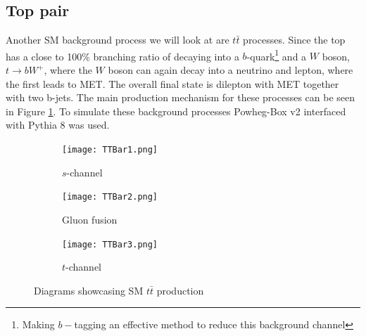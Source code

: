 \documentclass[12pt, a4paper]{book}
\begin{document}
\subsection{Top pair}
Another SM background process we will look at are $t\bar{t}$ processes. Since the top has a close to 100\% branching ratio of decaying into a $b$-quark\footnote{Making $b-$tagging an effective method to reduce this background channel} and a $W$ boson, $t\rightarrow bW^+$, where the $W$ boson can again decay into a neutrino and lepton,
where the first leads to MET. The overall final state is dilepton with MET together with two b-jets. The main production mechanism for these processes can be seen in Figure \ref{fig:TT_BKG}. To simulate these background processes Powheg-Box v2 \cite{PowHeg} interfaced with Pythia 8 \cite{Pythia} was used.
\begin{figure}[!ht]
    \centering
    \begin{subfigure}[b]{0.3\textwidth}
        \centering
        \texttt{[image: TTBar1.png]}
        \caption{$s$-channel}
    \end{subfigure}
    \hfill
    \begin{subfigure}[b]{0.3\textwidth}
        \centering
        \texttt{[image: TTBar2.png]}
        \caption{Gluon fusion}
    \end{subfigure}
    \hfill
    \begin{subfigure}[b]{0.3\textwidth}
        \centering
        \texttt{[image: TTBar3.png]}
        \caption{$t$-channel}
    \end{subfigure}
    \caption[$t\bar{t}$ production]{Diagrams showcasing SM $t\bar{t}$ production}\label{fig:TT_BKG}
\end{figure}
\end{document}
